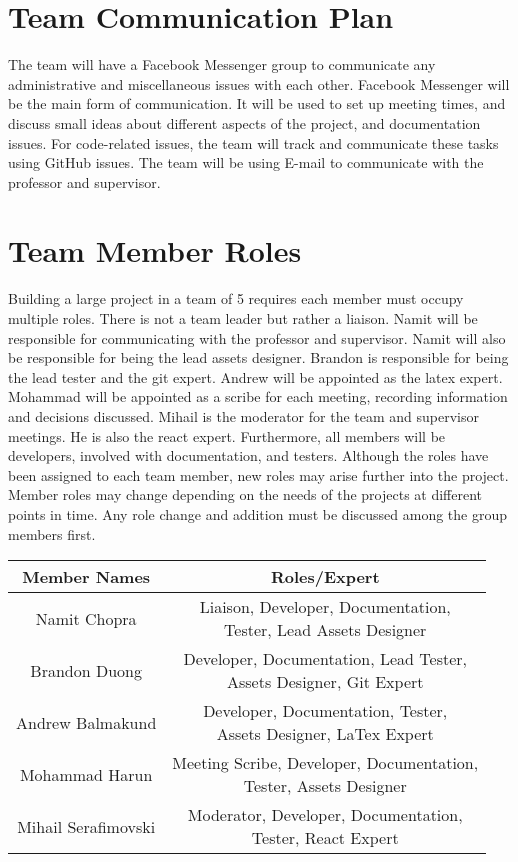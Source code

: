 \documentclass{article}
\begin{document}
\section{Team Communication Plan}
The team will have a Facebook Messenger group to communicate any administrative and miscellaneous issues with each other. Facebook Messenger will be the main form of communication. It will be used to set up meeting times, and discuss small ideas about different aspects of the project, and documentation issues. For code-related issues, the team will track and communicate these tasks using GitHub issues. The team will be using E-mail to communicate with the professor and supervisor.


\section{Team Member Roles}
Building a large project in a team of 5 requires each member must occupy multiple roles. There is not a team leader but rather a liaison. Namit will be responsible for communicating with the professor and supervisor. Namit will also be responsible for being the lead assets designer. Brandon is responsible for being the lead tester and the git expert. Andrew will be appointed as the latex expert. Mohammad will be appointed as a scribe for each meeting, recording information and decisions discussed. Mihail is the moderator for the team and supervisor meetings. He is also the react expert. Furthermore, all members will be developers, involved with documentation, and testers. Although the roles have been assigned to each team member, new roles may arise further into the project. Member roles may change depending on the needs of the projects at different points in time. Any role change and addition must be discussed among the group members first.


\begin{table}[h]
    \centering
    \begin{tabular}{|c|c|}
    \hline
         Member Names & Roles/Expert  \\
         \hline
         Namit Chopra & \shortstack{Liaison, Developer, Documentation, \\ Tester, Lead Assets Designer} \\
         \hline
         Brandon Duong & \shortstack{ Developer, Documentation, Lead Tester, \\Assets Designer, Git Expert }\\
         \hline
         Andrew Balmakund & \shortstack{ Developer, Documentation, Tester, \\ Assets Designer, LaTex Expert}\\
         \hline
         Mohammad Harun & \shortstack{Meeting Scribe,  Developer, Documentation, \\ Tester, Assets Designer} \\
         \hline
         Mihail Serafimovski & \shortstack{Moderator,  Developer, Documentation, \\ Tester, React Expert} \\
         \hline
    \end{tabular}
    \label{tab:my_label}
\end{table}
\end{document}

